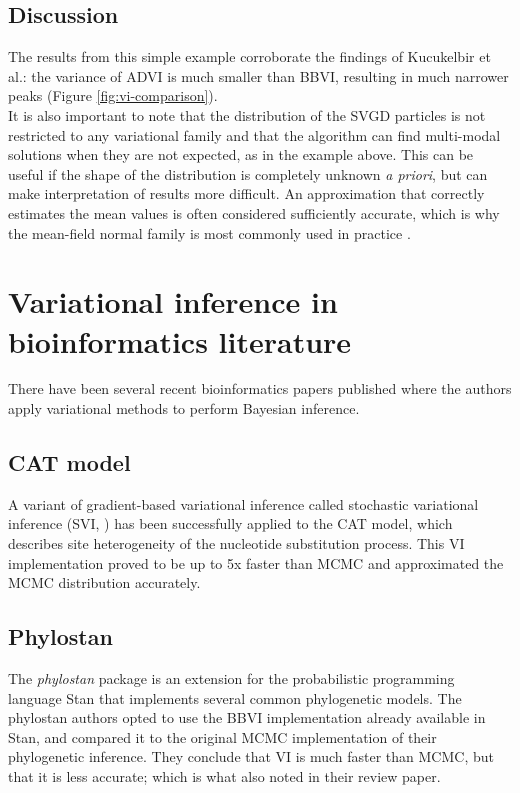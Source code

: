 \subsection{Discussion}
The results from this simple example corroborate the findings of Kucukelbir et al.: the variance of ADVI is much smaller than BBVI, resulting in much narrower peaks (Figure \ref{fig:vi-comparison}).
\\
It is also important to note that the distribution of the SVGD particles is not restricted to any variational family and that the algorithm can find multi-modal solutions when they are not expected, as in the example above. This can be useful if the shape of the distribution is completely unknown \textit{a priori}, but can make interpretation of results more difficult. An approximation that correctly estimates the mean values is often considered sufficiently accurate, which is why the mean-field normal family is most commonly used in practice \parencite{vi-review}.

\section{Variational inference in bioinformatics literature}

There have been several recent bioinformatics papers published where the authors apply variational methods to perform Bayesian inference.

\subsection{CAT model \parencite{cat}}
A variant of gradient-based variational inference called stochastic variational inference (SVI, \cite{svi}) has been successfully applied to the CAT model, which describes site heterogeneity of the nucleotide substitution process. This VI implementation proved to be up to 5x faster than MCMC and approximated the MCMC distribution accurately.

\subsection{Phylostan \parencite{phylostan}}
The \textit{phylostan} package is an extension for the probabilistic programming language Stan \parencite{Stan} that implements several common phylogenetic models. The phylostan authors opted to use the BBVI implementation already available in Stan, and compared it to the original MCMC implementation of their phylogenetic inference. They conclude that VI is much faster than MCMC, but that it is less accurate; which is what \cite{vi-review} also noted in their review paper.




